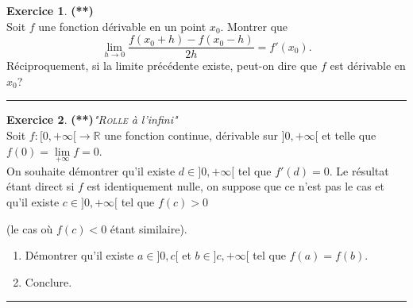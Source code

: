 \documentclass[a4paper,11pt]{article}
\theoremstyle{definition}
\newtheorem{exo}{Exercice} %
\begin{document}
\begin{minipage}{1\linewidth}
\begin{minipage}[t]{0.48\linewidth}
		
		\begin{exo}\textbf{(**)}\quad\\[0.2cm]
			Soit $f$ une fonction dérivable en un point $x_0$. Montrer que
			$$\lim_{h\to 0}\frac{f(x_0+h)-f(x_0-h)}{2h}=f'(x_0).$$
			Réciproquement, si la limite précédente existe, peut-on dire que $f$ est dérivable en $x_0$?
			
			\centering
			\rule{1\linewidth}{0.6pt}
		\end{exo}
	
	
	
	\begin{exo}\textbf{(**)}\quad \textit{"\textsc{Rolle} à l'infini"}\\[0.2cm] 
	Soit $f:[0,+\infty[\to\mathbb R$ une fonction continue, dérivable sur $]0,+\infty[$ et telle que $f(0)=\lim\limits_{+\infty}f=0$.\\[0.2cm]
	
	
	On souhaite démontrer qu'il existe $d\in]0,+\infty[$ tel que $f'(d)=0$. Le résultat étant direct si $f$ est identiquement nulle, on suppose que ce n'est pas le cas et qu'il existe $c\in]0,+\infty[$ tel que $f(c)>0$ 
	
	(le cas où $f(c)<0$ étant similaire).
	\begin{enumerate}
		\item Démontrer qu'il existe $a\in]0,c[$ et $b\in]c,+\infty[$ tel que $f(a)=f(b)$.
		\item Conclure.
	\end{enumerate}

		\centering
	\rule{1\linewidth}{0.6pt}
	\end{exo}

		
		
	\end{minipage}
\end{minipage}
\hfill\\
\end{document}
